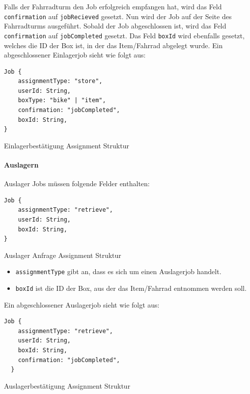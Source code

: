 Falls der Fahrradturm den Job erfolgreich empfangen hat, wird das Feld \texttt{confirmation} auf \texttt{jobRecieved} gesetzt. Nun wird der Job auf der Seite des Fahrradturms ausgeführt. Sobald der Job abgeschlossen ist, wird das Feld \texttt{confirmation} auf \texttt{jobCompleted} gesetzt. Das Feld \texttt{boxId} wird ebenfalls gesetzt, welches die ID der Box ist, in der das Item/Fahrrad abgelegt wurde. Ein abgeschlossener Einlagerjob sieht wie folgt aus:

\begin{listing}[H]
  \begin{verbatim}
Job {
    assignmentType: "store",
    userId: String,
    boxType: "bike" | "item",
    confirmation: "jobCompleted",
    boxId: String,
}
\end{verbatim}
  \caption{Einlagerbestätigung Assignment Struktur}
  \label{lst:einlagerbestaetigung_assignment_struktur}
\end{listing}

\paragraph{Auslagern}

Auslager Jobs müssen folgende Felder enthalten:

\begin{listing}[H]
  \begin{verbatim}
Job {
    assignmentType: "retrieve",
    userId: String,
    boxId: String,
}
\end{verbatim}
  \caption{Auslager Anfrage Assignment Struktur}
  \label{lst:auslager_assignment_struktur}
\end{listing}

\begin{itemize}
  \item \texttt{assignmentType} gibt an, dass es sich um einen Auslagerjob handelt.
  \item \texttt{boxId} ist die ID der Box, aus der das Item/Fahrrad entnommen werden soll.
\end{itemize}

Ein abgeschlossener Auslagerjob sieht wie folgt aus:

\begin{listing}[H]
  \begin{verbatim}
Job {
    assignmentType: "retrieve",
    userId: String,
    boxId: String,
    confirmation: "jobCompleted",
  }
\end{verbatim}
  \caption{Auslagerbestätigung Assignment Struktur}
  \label{lst:auslagerbestaetigung_assignment_struktur}
\end{listing}